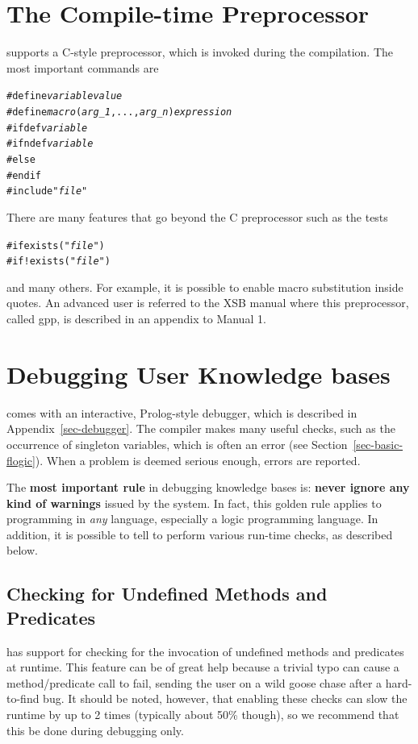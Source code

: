 \documentclass[11pt]{article}
\newcommand{\ERGO}{\mbox{\smaller{\ensuremath{\cal{E}}\smaller{{\sc{RGO}}}}}\xspace}
\newcommand{\FLSYSTEM}{\ERGO}
\begin{document}
\section{The Compile-time Preprocessor}\label{sec-gpp}

\FLSYSTEM supports a C-style preprocessor, which is invoked during the
compilation. The most important commands are
\begin{alltt}
   #define \emph{variable} \emph{value} 
   #define \emph{macro}(\emph{arg_1},...,\emph{arg_n}) \emph{expression} 
   #ifdef \emph{variable} 
   #ifndef \emph{variable} 
   #else
   #endif
   #include "\emph{file}" 
\end{alltt}
There are many features that go beyond the C preprocessor such as the tests
\begin{alltt}
   #if exists("\emph{file}") 
   #if !exists("\emph{file}") 
\end{alltt}
and many others. For example, it is possible to enable macro substitution
inside quotes. An advanced user is referred to the XSB manual where this
preprocessor, called gpp, is described in an appendix to Manual 1.


\section{Debugging User Knowledge bases}\label{sec-debugging}

\FLSYSTEM comes with an interactive, Prolog-style debugger, which is described
in Appendix~\ref{sec-debugger}. The compiler makes many useful checks, such
as the occurrence of singleton variables, which is often an error (see
Section~\ref{sec-basic-flogic}). When a problem is deemed serious enough,
errors are reported.

The \textbf{most important rule}  
in debugging \FLSYSTEM knowledge bases is: \textbf{never
  ignore any kind of warnings} issued by the system. In fact, this golden rule 
applies to programming in \emph{any} language, especially  a logic programming
language.  In addition, it is possible
to tell \FLSYSTEM to perform various run-time checks, as described below.

\subsection{Checking for Undefined Methods and Predicates}\label{sec-undef}

\FLSYSTEM has support for checking for the invocation of undefined methods and
predicates at runtime. This feature can be of great help because a trivial
typo can cause a method/predicate call to fail, sending the user on a
wild goose chase after a hard-to-find bug. It should be noted, however,
that enabling these checks can slow the runtime by up to 2 times (typically
about 50\% though), so we recommend that this be done during debugging only.
\end{document}
